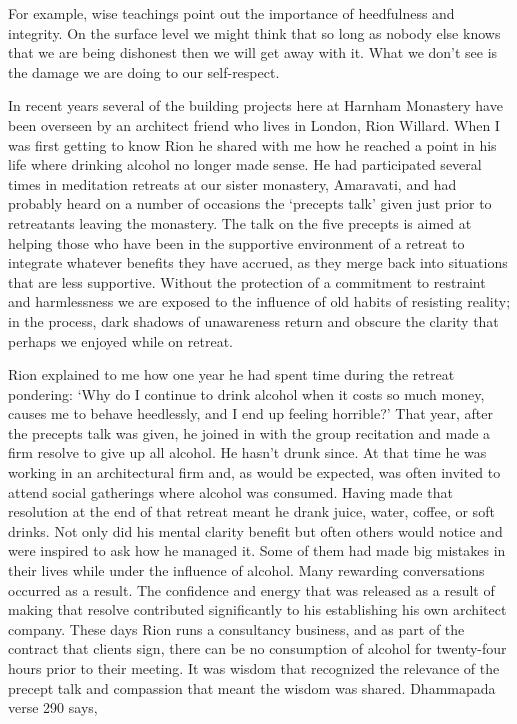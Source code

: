 For example, wise teachings point out the importance of heedfulness and
integrity. On the surface level we might think that so long as nobody
else knows that we are being dishonest then we will get away with it.
What we don't see is the damage we are doing to our self-respect.

In recent years several of the building projects here at Harnham Monastery have
been overseen by an architect friend who lives in London, Rion Willard.
When I was first getting to know Rion he shared with me how he reached a
point in his life where drinking alcohol no longer made sense. He had
participated several times in meditation retreats at our sister
monastery, Amaravati, and had probably heard on a number of occasions
the `precepts talk' given just prior to retreatants leaving the
monastery. The talk on the five precepts is aimed at helping those who
have been in the supportive environment of a retreat to integrate
whatever benefits they have accrued, as they merge back into situations
that are less supportive. Without the protection of a commitment to
restraint and harmlessness we are exposed to the influence of old habits
of resisting reality; in the process, dark shadows of unawareness return
and obscure the clarity that perhaps we enjoyed while on retreat.

Rion explained to me how one year he had spent time during the retreat
pondering: `Why do I continue to drink alcohol when it costs so much
money, causes me to behave heedlessly, and I end up feeling horrible?'
That year, after the precepts talk was given, he joined in with the
group recitation and made a firm resolve to give up all alcohol. He
hasn't drunk since. At that time he was working in an architectural firm
and, as would be expected, was often invited to attend social gatherings
where alcohol was consumed. Having made that resolution at the end of
that retreat meant he drank juice, water, coffee, or soft drinks. Not
only did his mental clarity benefit but often others would notice and
were inspired to ask how he managed it. Some of them had made big
mistakes in their lives while under the influence of alcohol. Many
rewarding conversations occurred as a result. The confidence and energy
that was released as a result of making that resolve contributed
significantly to his establishing his own architect company. These days
Rion runs a consultancy business, and as part of the contract that
clients sign, there can be no consumption of alcohol for twenty-four
hours prior to their meeting. It was wisdom that recognized the
relevance of the precept talk and compassion that meant the wisdom was
shared. Dhammapada verse 290 says,

